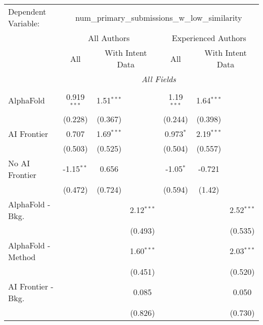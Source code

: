 \begingroup
\centering
\begin{tabular}{lcccccc}
   \tabularnewline \midrule \midrule
   Dependent Variable: & \multicolumn{6}{c}{num\_primary\_submissions\_w\_low\_similarity}\\
 & \multicolumn{3}{c}{All Authors} & \multicolumn{3}{c}{Experienced Authors} \\
\cmidrule(lr){2-4} \cmidrule(lr){5-7}
 & \multicolumn{1}{c}{All} & \multicolumn{2}{c}{With Intent Data} & \multicolumn{1}{c}{All} & \multicolumn{2}{c}{With Intent Data} \\
\cmidrule(lr){2-2} \cmidrule(lr){3-4} \cmidrule(lr){5-5} \cmidrule(lr){6-7}
 & \multicolumn{6}{c}{\textit{All Fields}} \\ \\
   AlphaFold               & 0.919$^{***}$ & 1.51$^{***}$ &              & 1.19$^{***}$ & 1.64$^{***}$ &   \\   
                           & (0.228)       & (0.367)      &              & (0.244)      & (0.398)      &   \\   
   AI Frontier             & 0.707         & 1.69$^{***}$ &              & 0.973$^{*}$  & 2.19$^{***}$ &   \\   
                           & (0.503)       & (0.525)      &              & (0.504)      & (0.557)      &   \\   
   No AI Frontier          & -1.15$^{**}$  & 0.656        &              & -1.05$^{*}$  & -0.721       &   \\   
                           & (0.472)       & (0.724)      &              & (0.594)      & (1.42)       &   \\   
   AlphaFold - Bkg.        &               &              & 2.12$^{***}$ &              &              & 2.52$^{***}$\\   
                           &               &              & (0.493)      &              &              & (0.535)\\   
   AlphaFold - Method      &               &              & 1.60$^{***}$ &              &              & 2.03$^{***}$\\   
                           &               &              & (0.451)      &              &              & (0.520)\\   
   AI Frontier - Bkg.      &               &              & 0.085        &              &              & 0.050\\   
                           &               &              & (0.826)      &              &              & (0.730)\\   

\end{tabular}
